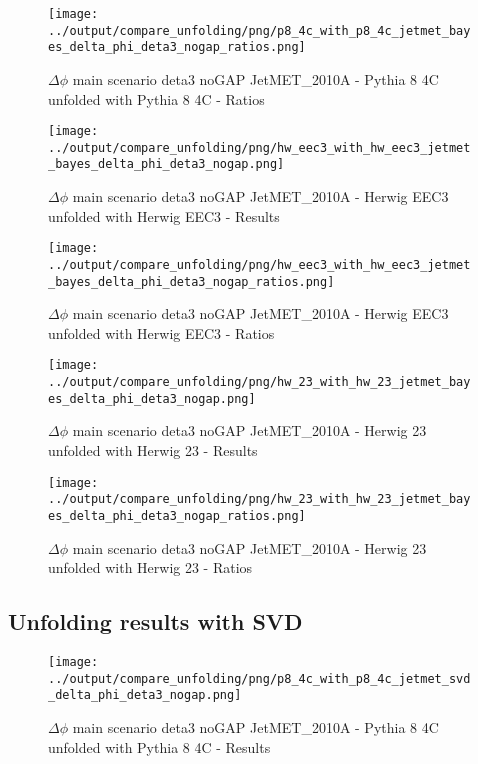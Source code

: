 \documentclass[11pt]{book}
\begin{document}
\begin{figure}[ht]
\centering
\texttt{[image: ../output/compare\_unfolding/png/p8\_4c\_with\_p8\_4c\_jetmet\_bayes\_delta\_phi\_deta3\_nogap\_ratios.png]}
\caption{$\Delta\phi$ main scenario deta3 noGAP JetMET\_2010A - Pythia 8 4C unfolded with Pythia 8 4C - Ratios}
\label{p8_p8_jetmet_bayes_delta_phi_deta3_nogap_b}
\end{figure}

\begin{figure}[ht]
\centering
\texttt{[image: ../output/compare\_unfolding/png/hw\_eec3\_with\_hw\_eec3\_jetmet\_bayes\_delta\_phi\_deta3\_nogap.png]}
\caption{$\Delta\phi$ main scenario deta3 noGAP JetMET\_2010A - Herwig EEC3 unfolded with Herwig EEC3 - Results}
\label{hw_eec3_hw_eec3_jetmet_bayes_delta_phi_deta3_nogap_a}
\end{figure}

\begin{figure}[ht]
\centering
\texttt{[image: ../output/compare\_unfolding/png/hw\_eec3\_with\_hw\_eec3\_jetmet\_bayes\_delta\_phi\_deta3\_nogap\_ratios.png]}
\caption{$\Delta\phi$ main scenario deta3 noGAP JetMET\_2010A - Herwig EEC3 unfolded with Herwig EEC3 - Ratios}
\label{hw_eec3_hw_eec3_jetmet_bayes_delta_phi_deta3_nogap_b}
\end{figure}

\begin{figure}[ht]
\centering
\texttt{[image: ../output/compare\_unfolding/png/hw\_23\_with\_hw\_23\_jetmet\_bayes\_delta\_phi\_deta3\_nogap.png]}
\caption{$\Delta\phi$ main scenario deta3 noGAP JetMET\_2010A - Herwig 23 unfolded with Herwig 23 - Results}
\label{hw_23_hw_23_jetmet_bayes_delta_phi_deta3_nogap_a}
\end{figure}

\begin{figure}[ht]
\centering
\texttt{[image: ../output/compare\_unfolding/png/hw\_23\_with\_hw\_23\_jetmet\_bayes\_delta\_phi\_deta3\_nogap\_ratios.png]}
\caption{$\Delta\phi$ main scenario deta3 noGAP JetMET\_2010A - Herwig 23 unfolded with Herwig 23 - Ratios}
\label{hw_23_hw_23_jetmet_bayes_delta_phi_deta3_nogap_b}
\end{figure}


\clearpage
\subsection{Unfolding results with SVD}

\begin{figure}[ht]
\centering
\texttt{[image: ../output/compare\_unfolding/png/p8\_4c\_with\_p8\_4c\_jetmet\_svd\_delta\_phi\_deta3\_nogap.png]}
\caption{$\Delta\phi$ main scenario deta3 noGAP JetMET\_2010A - Pythia 8 4C unfolded with Pythia 8 4C - Results}
\label{p8_p8_jetmet_svd_delta_phi_deta3_nogap_a}
\end{figure}
\end{document}
